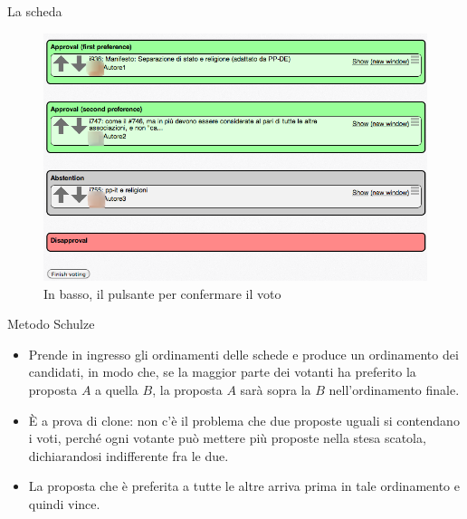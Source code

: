 \documentclass[ignorenonframetext]{beamer}\usetheme{default}
\begin{document}
\begin{frame}{La scheda}
\begin{figure}\includegraphics[width=.9\textwidth]{pics/scheda}
\caption{In basso, il pulsante per confermare il voto}
\end{figure}
\end{frame}

\begin{frame}{Metodo Schulze}
\begin{itemize}
\item Prende in ingresso gli ordinamenti delle schede e produce un ordinamento dei candidati, in modo che, se la maggior parte dei votanti ha preferito la proposta $A$ a quella $B$, la proposta $A$ sar\`a sopra la $B$ nell'ordinamento finale.
\item \`E a prova di clone: non c'\`e il problema che due proposte uguali si contendano i voti, perch\'e ogni votante pu\`o mettere pi\`u proposte nella stesa scatola, dichiarandosi indifferente fra le due.
\item \alert{La proposta che \`e preferita a tutte le altre arriva prima in tale ordinamento e quindi vince}.
\end{itemize}
\end{frame}
\end{document}
